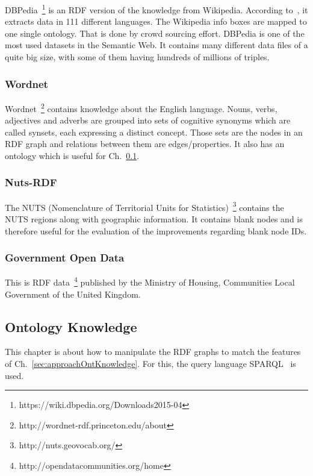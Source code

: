 DBPedia~\footnote{https://wiki.dbpedia.org/Downloads2015-04} is an RDF version of the knowledge from Wikipedia. According to~\cite{dbpedia}, it extracts data in 111 different languages. The Wikipedia info boxes are mapped to one single ontology. That is done by crowd sourcing effort. DBPedia is one of the most used datasets in the Semantic Web.  It contains many different data files of a quite big size, with some of them having hundreds of millions of triples.~\cite{dbpedia}

\subsubsection{Wordnet}

Wordnet~\footnote{http://wordnet-rdf.princeton.edu/about} contains knowledge about the English language. Nouns, verbs, adjectives and adverbs are grouped into sets of cognitive synonyms which are called synsets, each expressing a distinct concept. Those sets are the nodes in an RDF graph and relations between them are edges/properties. It also has an ontology which is useful for Ch.~\ref{sec:implementationOntKnowledge}.~\cite{wordnet}

\subsubsection{Nuts-RDF}

The NUTS (Nomenclature of Territorial Units for Statistics)~\footnote{http://nuts.geovocab.org/} contains the NUTS regions along with geographic information. It contains blank nodes and is therefore useful for the evaluation of the improvements regarding blank node IDs.

\subsubsection{Government Open Data}

This is RDF data~\footnote{http://opendatacommunities.org/home} published by the Ministry of Housing, Communities Local Government of the United Kingdom.

\subsection{Ontology Knowledge}\label{sec:implementationOntKnowledge}

This chapter is about how to manipulate the RDF graphs to match the features of Ch.~\ref{sec:approachOntKnowledge}. For this, the query language SPARQL~\cite{sparql} is used.


